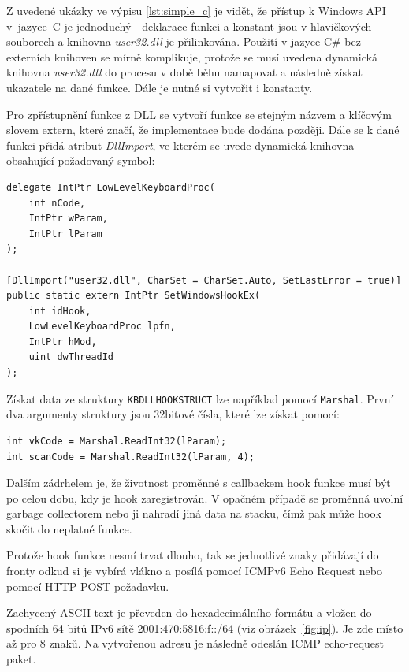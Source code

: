 \documentclass[12pt]{article}
\newcommand{\Csh}{C\#}
\begin{document}
{
	\inputminted{c}{../c/simple.c}
	\label{lst:simple_c}
}


Z uvedené ukázky ve výpisu \ref{lst:simple_c} je vidět, že přístup k Windows API v~jazyce~C je jednoduchý - deklarace funkci a konstant jsou v hlavičkových souborech a knihovna \textit{user32.dll} je přilinkována.
Použití v jazyce \Csh{} bez externích knihoven se mírně komplikuje, protože se musí uvedena dynamická knihovna \textit{user32.dll} do procesu v době běhu namapovat a následně získat ukazatele na dané funkce.
Dále je nutné si vytvořit i konstanty.

Pro zpřístupnění funkce z DLL se vytvoří funkce se stejným názvem a klíčovým slovem extern, které značí, že implementace bude dodána později.
Dále se k dané funkci přidá atribut \textit{DllImport}, ve kterém se uvede dynamická knihovna obsahující požadovaný symbol:


\begin{verbatim}
delegate IntPtr LowLevelKeyboardProc(
	int nCode,
	IntPtr wParam,
	IntPtr lParam
);

[DllImport("user32.dll", CharSet = CharSet.Auto, SetLastError = true)]
public static extern IntPtr SetWindowsHookEx(
	int idHook,
	LowLevelKeyboardProc lpfn,
	IntPtr hMod,
	uint dwThreadId
);
\end{verbatim}

Získat data ze struktury \texttt{KBDLLHOOKSTRUCT} lze například pomocí \texttt{Marshal}.
První dva argumenty struktury jsou 32bitové čísla, které lze získat pomocí: 
\begin{verbatim}
int vkCode = Marshal.ReadInt32(lParam);
int scanCode = Marshal.ReadInt32(lParam, 4);
\end{verbatim}

Dalším zádrhelem je, že životnost proměnné s callbackem hook funkce musí být po celou dobu, kdy je hook zaregistrován.
V opačném případě se proměnná uvolní garbage collectorem nebo ji nahradí jiná data na stacku, čímž pak může hook skočit do neplatné funkce.

Protože hook funkce nesmí trvat dlouho, tak se jednotlivé znaky přidávají do fronty odkud si je vybírá vlákno a posílá pomocí ICMPv6 Echo Request nebo pomocí HTTP POST požadavku.

Zachycený ASCII text je převeden do hexadecimálního formátu a vložen do spodních 64 bitů IPv6 sítě 2001:470:5816:f::/64 (viz obrázek~\ref{fig:ip}). Je zde místo až pro 8 znaků.
Na vytvořenou adresu je následně odeslán ICMP echo-request paket.
\end{document}
